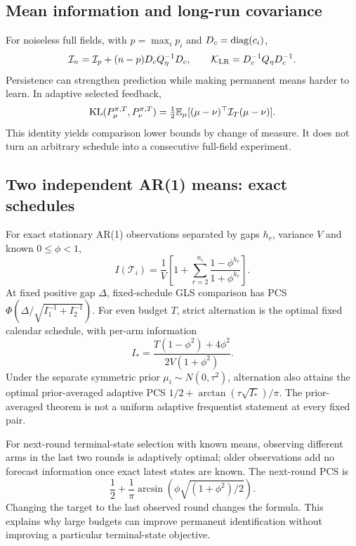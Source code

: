 \subsection{Mean information and long-run covariance}
For noiseless full fields, with $p=\max_i p_i$ and $D_c=\operatorname{diag}(c_i)$,
\begin{equation}
\mathcal I_n=\mathcal I_p+(n-p)D_cQ_\eta^{-1}D_c,
\qquad \mathcal K_{\rm LR}=D_c^{-1}Q_\eta D_c^{-1}.
\end{equation}
Persistence can strengthen prediction while making permanent means harder to learn. In adaptive selected feedback,
\begin{equation}
\operatorname{KL}(P_\mu^{\pi,T},P_\nu^{\pi,T})
=\tfrac12\mathbb E_\mu[(\mu-\nu)^\top\mathcal I_T(\mu-\nu)].
\end{equation}
This identity yields comparison lower bounds by change of measure. It does not turn an arbitrary schedule into a consecutive full-field experiment.

\subsection{Two independent AR(1) means: exact schedules}
For exact stationary AR(1) observations separated by gaps $h_r$, variance $V$ and known $0\le\phi<1$,
\begin{equation}
I(\mathcal T_i)=\frac1V\left[1+\sum_{r=2}^{n_i}\frac{1-\phi^{h_r}}{1+\phi^{h_r}}\right].
\end{equation}
At fixed positive gap $\Delta$, fixed-schedule GLS comparison has PCS
$\Phi(\Delta/\sqrt{I_1^{-1}+I_2^{-1}})$. For even budget $T$, strict alternation is the optimal fixed calendar schedule, with per-arm information
\begin{equation}
I_*=\frac{T(1-\phi^2)+4\phi^2}{2V(1+\phi^2)}.
\end{equation}
Under the separate symmetric prior $\mu_i\sim N(0,\tau^2)$, alternation also attains the optimal prior-averaged adaptive PCS
$1/2+\arctan(\tau\sqrt{I_*})/\pi$. The prior-averaged theorem is not a uniform adaptive frequentist statement at every fixed pair.

For next-round terminal-state selection with known means, observing different arms in the last two rounds is adaptively optimal; older observations add no forecast information once exact latest states are known. The next-round PCS is
\begin{equation}
\frac12+\frac1\pi\arcsin\left(\phi\sqrt{(1+\phi^2)/2}\right).
\end{equation}
Changing the target to the last observed round changes the formula. This explains why large budgets can improve permanent identification without improving a particular terminal-state objective.

